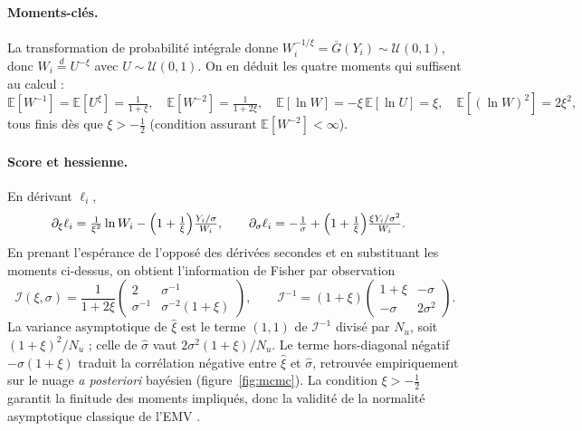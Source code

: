 \documentclass[11pt,a4paper]{article}
\theoremstyle{navystyle}
\theoremstyle{navydef}
\newcommand{\E}{\mathbb{E}}
\begin{document}
\paragraph{Moments-clés.} La transformation de probabilité intégrale donne $W_i^{-1/\xi}=\bar G(Y_i)\sim\mathcal U(0,1)$, donc $W_i\overset{d}{=}U^{-\xi}$ avec $U\sim\mathcal U(0,1)$. On en déduit les quatre moments qui suffisent au calcul :
\begin{equation}
\E[W^{-1}]=\E[U^{\xi}]=\tfrac{1}{1+\xi},\quad
\E[W^{-2}]=\tfrac{1}{1+2\xi},\quad
\E[\ln W]=-\xi\,\E[\ln U]=\xi,\quad
\E[(\ln W)^2]=2\xi^2,
\end{equation}
tous finis dès que $\xi>-\tfrac12$ (condition assurant $\E[W^{-2}]<\infty$).

\paragraph{Score et hessienne.} En dérivant $\ell_i$,
\begin{align*}
\partial_\xi\ell_i&=\tfrac{1}{\xi^2}\ln W_i-\Bigl(1+\tfrac1\xi\Bigr)\tfrac{Y_i/\sigma}{W_i},\qquad
\partial_\sigma\ell_i=-\tfrac1\sigma+\Bigl(1+\tfrac1\xi\Bigr)\tfrac{\xi Y_i/\sigma^2}{W_i}.
\end{align*}
En prenant l'espérance de l'opposé des dérivées secondes et en substituant les moments ci-dessus, on obtient l'information de Fisher par observation
\begin{equation}
\mathcal{I}(\xi,\sigma)=\frac{1}{1+2\xi}\begin{pmatrix} 2 & \sigma^{-1}\\[2pt] \sigma^{-1} & \sigma^{-2}(1+\xi)\end{pmatrix},\qquad
\mathcal{I}^{-1}=(1+\xi)\begin{pmatrix} 1+\xi & -\sigma\\[2pt] -\sigma & 2\sigma^2\end{pmatrix}.
\end{equation}
La variance asymptotique de $\hat\xi$ est le terme $(1,1)$ de $\mathcal I^{-1}$ divisé par $N_u$, soit $(1+\xi)^2/N_u$ ; celle de $\hat\sigma$ vaut $2\sigma^2(1+\xi)/N_u$. Le terme hors-diagonal négatif $-\sigma(1+\xi)$ traduit la corrélation négative entre $\hat\xi$ et $\hat\sigma$, retrouvée empiriquement sur le nuage \emph{a posteriori} bayésien (figure~\ref{fig:mcmc}). La condition $\xi>-\tfrac12$ garantit la finitude des moments impliqués, donc la validité de la normalité asymptotique classique de l'EMV \citep{smith1987}.
\end{document}
